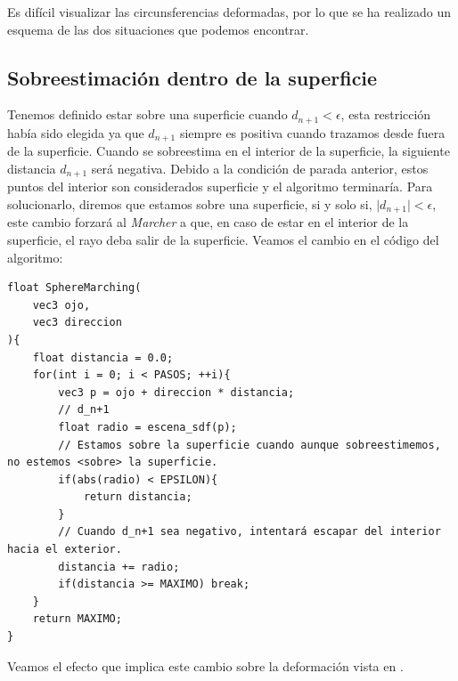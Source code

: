 Es difícil visualizar las circunsferencias deformadas, por lo que se ha realizado un esquema de las dos situaciones que podemos encontrar.

\subsection{Sobreestimación dentro de la superficie}
Tenemos definido estar sobre una superficie cuando \(d_{n+1}<\epsilon\), esta restricción había sido elegida ya que \(d_{n+1}\) siempre es positiva cuando trazamos desde fuera de la superficie. Cuando se sobreestima en el interior de la superficie, la siguiente distancia \(d_{n+1}\) será negativa. Debido a la condición de parada anterior, estos puntos del interior son considerados superficie y el algoritmo terminaría. Para solucionarlo, diremos que estamos sobre una superficie, si y solo si, \( \vert d_{n+1} \vert < \epsilon\), este cambio forzará al \textit{Marcher} a que, en caso de estar en el interior de la superficie, el rayo deba salir de la superficie. Veamos el cambio en el código del algoritmo: 
\begin{lstlisting}
float SphereMarching(
    vec3 ojo, 
    vec3 direccion
){
    float distancia = 0.0;
    for(int i = 0; i < PASOS; ++i){
        vec3 p = ojo + direccion * distancia;
        // d_n+1
        float radio = escena_sdf(p);
        // Estamos sobre la superficie cuando aunque sobreestimemos, no estemos <sobre> la superficie. 
        if(abs(radio) < EPSILON){
            return distancia;
        }
        // Cuando d_n+1 sea negativo, intentará escapar del interior hacia el exterior.
        distancia += radio;
        if(distancia >= MAXIMO) break;
    }
    return MAXIMO;
}
\end{lstlisting}

Veamos el efecto que implica este cambio sobre la deformación vista en .

